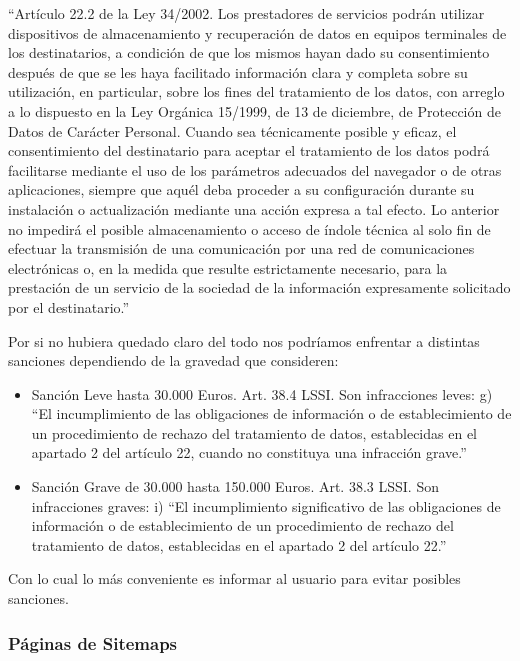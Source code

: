 ``Artículo 22.2 de la Ley 34/2002. Los prestadores de servicios podrán utilizar dispositivos de almacenamiento y recuperación de datos en equipos terminales de los destinatarios, a condición de que los mismos hayan dado su consentimiento después de que se les haya facilitado información clara y completa sobre su utilización, en particular, sobre los fines del tratamiento de los datos, con arreglo a lo dispuesto en la Ley Orgánica 15/1999, de 13 de diciembre, de Protección de Datos de Carácter Personal. Cuando sea técnicamente posible y eficaz, el consentimiento del destinatario para aceptar el tratamiento de los datos podrá facilitarse mediante el uso de los parámetros adecuados del navegador o de otras aplicaciones, siempre que aquél deba proceder a su configuración durante su instalación o actualización mediante una acción expresa a tal efecto. Lo anterior no impedirá el posible almacenamiento o acceso de índole técnica al solo fin de efectuar la transmisión de una comunicación por una red de comunicaciones electrónicas o, en la medida que resulte estrictamente necesario, para la prestación de un servicio de la sociedad de la información expresamente solicitado por el destinatario.''


Por si no hubiera quedado claro del todo nos podríamos enfrentar a distintas sanciones dependiendo de la gravedad que consideren:


\begin{itemize}
\item Sanción Leve hasta 30.000 Euros.  Art. 38.4 LSSI. Son infracciones leves:
g) ``El incumplimiento de las obligaciones de información o de establecimiento de un procedimiento de rechazo del tratamiento de datos, establecidas en el apartado 2 del artículo 22, cuando no constituya una infracción grave.''
\item Sanción Grave de 30.000 hasta 150.000 Euros. Art. 38.3 LSSI. Son infracciones graves:
i) ``El incumplimiento significativo de las obligaciones de información o de establecimiento de un procedimiento de rechazo del tratamiento de datos, establecidas en el apartado 2 del artículo 22.''
\end{itemize}


Con lo cual lo más conveniente es informar al usuario para evitar posibles sanciones.
 

\subsubsection{Páginas de Sitemaps}
\label{subsubsec:sitemap}


